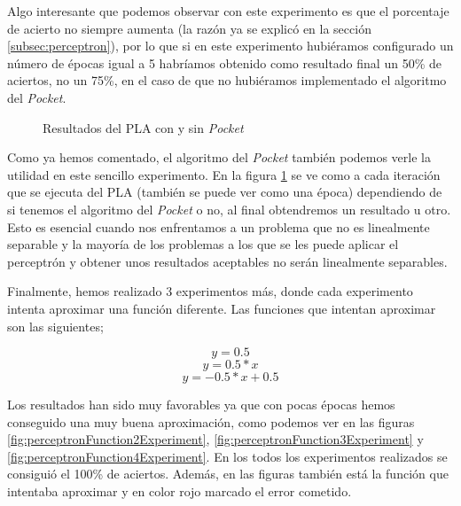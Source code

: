 \newpage
Algo interesante que podemos observar con este experimento es que el porcentaje de acierto no siempre aumenta (la razón ya se explicó en la sección \ref{subsec:perceptron}), por lo que si en este experimento hubiéramos configurado un número de épocas igual a 5 habríamos obtenido como resultado final un 50\% de aciertos, no un 75\%, en el caso de que no hubiéramos implementado el algoritmo del \textit{Pocket}.

\begin{figure}[!h]
\centering
\caption{Resultados del PLA con y sin \textit{Pocket}}
\label{plot:perceptronResultsWithAndWithoutPocket}
\end{figure}

Como ya hemos comentado, el algoritmo del \textit{Pocket} también podemos verle la utilidad en este sencillo experimento. En la figura \ref{plot:perceptronResultsWithAndWithoutPocket} se ve como a cada iteración que se ejecuta del PLA (también se puede ver como una época) dependiendo de si tenemos el algoritmo del \textit{Pocket} o no, al final obtendremos un resultado u otro. Esto es esencial cuando nos enfrentamos a un problema que no es linealmente separable y la mayoría de los problemas a los que se les puede aplicar el perceptrón y obtener unos resultados aceptables no serán linealmente separables.

\newpage
Finalmente, hemos realizado 3 experimentos más, donde cada experimento intenta aproximar una función diferente. Las funciones que intentan aproximar son las siguientes;

\[y=0.5\]
\[y=0.5*x\]
\[y=-0.5*x+0.5\]

Los resultados han sido muy favorables ya que con pocas épocas hemos conseguido una muy buena aproximación, como podemos ver en las figuras \ref{fig:perceptronFunction2Experiment}, \ref{fig:perceptronFunction3Experiment} y \ref{fig:perceptronFunction4Experiment}. En los todos los experimentos realizados se consiguió el 100\% de aciertos. Además, en las figuras también está la función que intentaba aproximar y en color rojo marcado el error cometido.

